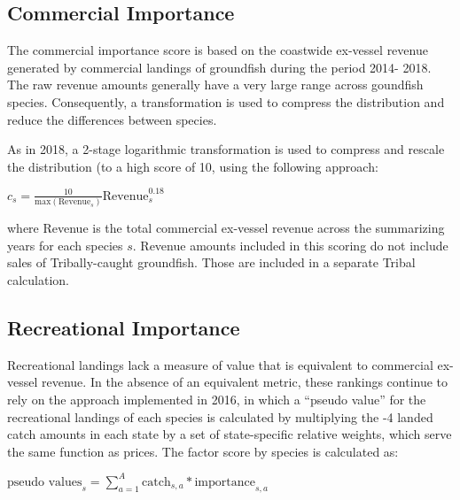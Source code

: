 \documentclass[12pt,]{article}
\begin{document}
\FloatBarrier

\subsection{Commercial Importance}\label{commercial-importance}

The commercial importance score is based on the coastwide ex-vessel
revenue generated by commercial landings of groundfish during the period
2014- 2018. The raw revenue amounts generally have a very large range
across goundfish species. Consequently, a transformation is used to
compress the distribution and reduce the differences between species.

As in 2018, a 2-stage logarithmic transformation is used to compress and
rescale the distribution (to a high score of 10, using the following
approach:

\begin{centering}

  $c_{s} = \frac{10}{\text{max}(\text{Revenue}_s)}\text{Revenue}_s^{0.18} $

\end{centering}

where Revenue is the total commercial ex-vessel revenue across the
summarizing years for each species \(s\). Revenue amounts included in
this scoring do not include sales of Tribally-caught groundfish. Those
are included in a separate Tribal calculation.

\subsection{Recreational Importance}\label{recreational-importance}

Recreational landings lack a measure of value that is equivalent to
commercial ex-vessel revenue. In the absence of an equivalent metric,
these rankings continue to rely on the approach implemented in 2016, in
which a ``pseudo value'' for the recreational landings of each species
is calculated by multiplying the -4 landed catch amounts in each state
by a set of state-specific relative weights, which serve the same
function as prices. The factor score by species is calculated as:

\begin{centering}

$\text{pseudo values}_{s} = \sum_{a=1}^{A} \text{catch}_{s,a}*\text{importance}_{s,a} $
  
  \end{centering}
\end{document}
